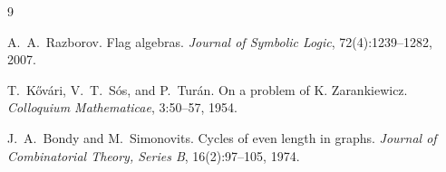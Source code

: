\documentclass[11pt]{article}
\theoremstyle{definition}
\begin{document}
\begin{thebibliography}{9}

A.~A.~Razborov.
\newblock Flag algebras.
\newblock \emph{Journal of Symbolic Logic}, 72(4):1239--1282, 2007.

T.~K\H{o}v\'ari, V.~T.~S\'os, and P.~Tur\'an.
\newblock On a problem of K. Zarankiewicz.
\newblock \emph{Colloquium Mathematicae}, 3:50--57, 1954.

J.~A.~Bondy and M.~Simonovits.
\newblock Cycles of even length in graphs.
\newblock \emph{Journal of Combinatorial Theory, Series B}, 16(2):97--105, 1974.

\end{thebibliography}
\end{document}
